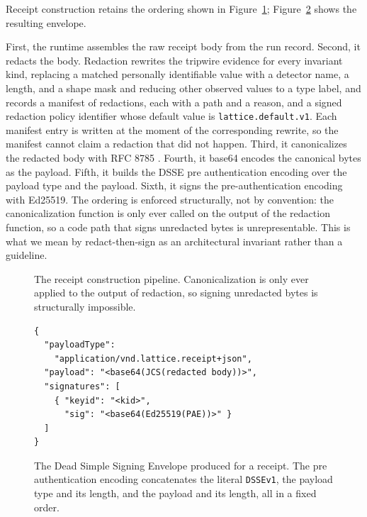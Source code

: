 \documentclass[conference]{IEEEtran}
\newcommand{\code}[1]{\texttt{\small #1}}
\begin{document}
Receipt construction retains the ordering shown in Figure~\ref{fig:pipeline};
Figure~\ref{fig:envelope} shows the resulting envelope.

First, the runtime assembles the raw receipt body from the run record. Second, it
redacts the body. Redaction rewrites the tripwire evidence for every invariant kind,
replacing a matched personally identifiable value with a detector name, a length, and
a shape mask and reducing other observed values to a type label, and records a
manifest of redactions, each with a path and a reason, and a signed redaction policy
identifier whose default value is \code{lattice.default.v1}. Each manifest entry is
written at the moment of the corresponding rewrite, so the manifest cannot claim a
redaction that did not happen.
Third, it canonicalizes the redacted body with RFC 8785 \cite{rfc8785}. Fourth, it
base64 encodes the canonical bytes as the payload. Fifth, it builds the DSSE pre
authentication encoding over the payload type and the payload. Sixth, it signs the
pre-authentication encoding with Ed25519. The ordering is enforced structurally, not
by convention: the canonicalization function is only ever called on the output of the
redaction function, so a code path that signs unredacted bytes is unrepresentable.
This is what we mean by redact-then-sign as an architectural invariant rather than a
guideline.

\begin{figure}[t]
\centering
{}
\caption{The receipt construction pipeline. Canonicalization is only ever applied to
the output of redaction, so signing unredacted bytes is structurally impossible.}
\label{fig:pipeline}
\end{figure}

\begin{figure}[t]
\centering
\scriptsize
\begin{verbatim}
{
  "payloadType":
    "application/vnd.lattice.receipt+json",
  "payload": "<base64(JCS(redacted body))>",
  "signatures": [
    { "keyid": "<kid>",
      "sig": "<base64(Ed25519(PAE))>" }
  ]
}
\end{verbatim}
\caption{The Dead Simple Signing Envelope produced for a receipt. The pre
authentication encoding concatenates the literal \code{DSSEv1}, the payload type and
its length, and the payload and its length, all in a fixed order.}
\label{fig:envelope}
\end{figure}
\end{document}
